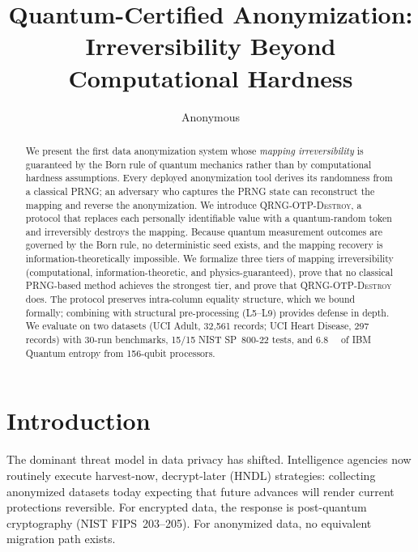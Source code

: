 \documentclass[acmsmall,screen,review,anonymous]{acmart}
\begin{document}
\title{Quantum-Certified Anonymization: Irreversibility Beyond Computational Hardness}

\author{Anonymous}

\begin{abstract}
We present the first data anonymization system whose \emph{mapping irreversibility} is guaranteed by the Born rule of quantum mechanics rather than by computational hardness assumptions. Every deployed anonymization tool derives its randomness from a classical PRNG; an adversary who captures the PRNG state can reconstruct the mapping and reverse the anonymization. We introduce \textsc{QRNG-OTP-Destroy}, a protocol that replaces each personally identifiable value with a quantum-random token and irreversibly destroys the mapping. Because quantum measurement outcomes are governed by the Born rule, no deterministic seed exists, and the mapping recovery is information-theoretically impossible. We formalize three tiers of mapping irreversibility (computational, information-theoretic, and physics-guaranteed), prove that no classical PRNG-based method achieves the strongest tier, and prove that \textsc{QRNG-OTP-Destroy} does. The protocol preserves intra-column equality structure, which we bound formally; combining with structural pre-processing (L5--L9) provides defense in depth. We evaluate on two datasets (UCI Adult, 32,561 records; UCI Heart Disease, 297 records) with 30-run benchmarks, 15/15 NIST SP~800-22 tests, and \SI{6.8}{\mega\byte} of IBM Quantum entropy from 156-qubit processors.
\end{abstract}


\maketitle

\section{Introduction}
\label{sec:intro}

The dominant threat model in data privacy has shifted. Intelligence agencies now routinely execute harvest-now, decrypt-later (HNDL) strategies: collecting anonymized datasets today expecting that future advances will render current protections reversible. For encrypted data, the response is post-quantum cryptography (NIST FIPS~203--205). For anonymized data, no equivalent migration path exists.
\end{document}
